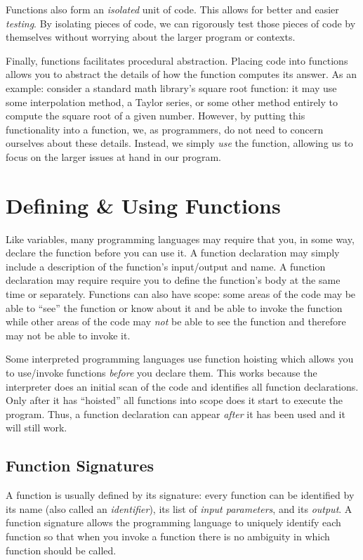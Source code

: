 Functions also form an \emph{isolated} unit of code.  This allows for 
better and easier \emph{testing}.  By isolating pieces of code, we can 
rigorously test those pieces of code by themselves without worrying 
about the larger program or contexts.  

Finally, functions facilitates \gls{procedural abstraction}.  Placing code 
into functions allows you to abstract the details of how the function computes 
its answer.  As an example: consider a standard math library's square root
function: it may use some interpolation method, a Taylor series, or some 
other method entirely to compute the square root of a given number.  
However, by putting this functionality into a function, we, as programmers, 
do not need to concern ourselves about these details.  Instead, we simply 
\emph{use} the function, allowing us to focus on the larger issues at hand 
in our program.

\section{Defining \& Using Functions}

Like variables, many programming languages may require that you, in 
some way, declare the function before you can use it.  A function
declaration may simply include a description of the function's input/output
and name.  A function declaration may require require you to define
the function's body at the same time or separately.  Functions can also
have scope: some areas of the code may be able to ``see'' the function
or know about it and be able to invoke the function while other areas of
the code may \emph{not} be able to see the function and therefore may
not be able to invoke it.  

Some interpreted programming languages use function \gls{hoisting} which allows
you to use/invoke functions \emph{before} you declare them.  This works
because the interpreter does an initial scan of the code and
identifies all function declarations.  Only after it has ``hoisted'' all functions
into scope does it start to execute the program.  Thus, a function declaration
can appear \emph{after} it has been used and it will still work.

\subsection{Function Signatures}

A function is usually defined by its \gls{signature}: every function can be
identified by its name (also called an \emph{identifier}), its list of 
\emph{input parameters}, and its \emph{output}.  A function signature
allows the programming language to uniquely identify each function
so that when you invoke a function there is no ambiguity in which function
should be called.

